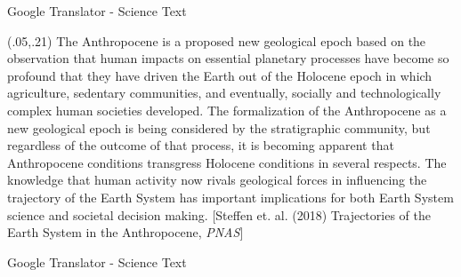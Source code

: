 \documentclass{beamer}
\begin{document}
\begin{frame} {Google Translator - Science Text}
\begin{textblock}{1}(.05,.21)
  \footnotesize {The Anthropocene is a proposed new geological epoch based on the observation that human impacts on essential planetary processes have become so profound that they have driven the Earth out of the Holocene epoch in which agriculture, sedentary communities, and eventually, socially and technologically complex human societies developed. The formalization of the Anthropocene as a new geological epoch is being considered by the stratigraphic community, but regardless of the outcome of that process, it is becoming apparent that Anthropocene conditions transgress Holocene conditions in several respects. The knowledge that human activity now rivals geological forces in influencing the trajectory of the Earth System has important implications for both Earth System science and societal decision making. [Steffen et. al. (2018) Trajectories of the Earth System in the Anthropocene, \textit{PNAS}]}
\end{textblock}

\end{frame}

\begin{frame} {Google Translator - Science Text}
 
\end{frame}
\end{document}
